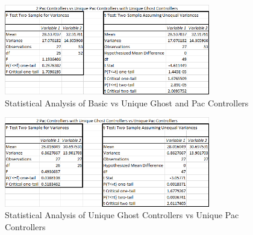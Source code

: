 \documentclass{article}
\begin{document}
\begin{flushleft}
\begin{figure}[h]
	\centering
	\includegraphics[width=0.8\textwidth]{stats2VsUniquePacAndUniqueGhost}
	\caption{Statistical Analysis of Basic vs Unique Ghost and Pac Controllers}
\end{figure}

\vspace{15mm}

\begin{figure}[h]
	\centering
	\includegraphics[width=0.8\textwidth]{stats2UniqueGhostVsUniquePac}
	\caption{Statistical Analysis of Unique Ghost Controllers vs Unique Pac Controllers}
\end{figure}
\end{flushleft}

\clearpage
\end{document}
